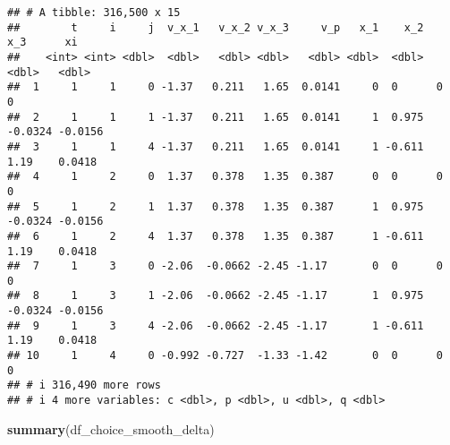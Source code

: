 \documentclass[
]{book}
\newenvironment{Shaded}{\begin{snugshade}}{\end{snugshade}}
\newcommand{\FunctionTok}[1]{\textcolor[rgb]{0.13,0.29,0.53}{\textbf{#1}}}
\newcommand{\NormalTok}[1]{#1}
\begin{document}
\begin{verbatim}
## # A tibble: 316,500 x 15
##        t     i     j  v_x_1   v_x_2 v_x_3     v_p   x_1    x_2     x_3      xi
##    <int> <int> <dbl>  <dbl>   <dbl> <dbl>   <dbl> <dbl>  <dbl>   <dbl>   <dbl>
##  1     1     1     0 -1.37   0.211   1.65  0.0141     0  0      0       0     
##  2     1     1     1 -1.37   0.211   1.65  0.0141     1  0.975 -0.0324 -0.0156
##  3     1     1     4 -1.37   0.211   1.65  0.0141     1 -0.611  1.19    0.0418
##  4     1     2     0  1.37   0.378   1.35  0.387      0  0      0       0     
##  5     1     2     1  1.37   0.378   1.35  0.387      1  0.975 -0.0324 -0.0156
##  6     1     2     4  1.37   0.378   1.35  0.387      1 -0.611  1.19    0.0418
##  7     1     3     0 -2.06  -0.0662 -2.45 -1.17       0  0      0       0     
##  8     1     3     1 -2.06  -0.0662 -2.45 -1.17       1  0.975 -0.0324 -0.0156
##  9     1     3     4 -2.06  -0.0662 -2.45 -1.17       1 -0.611  1.19    0.0418
## 10     1     4     0 -0.992 -0.727  -1.33 -1.42       0  0      0       0     
## # i 316,490 more rows
## # i 4 more variables: c <dbl>, p <dbl>, u <dbl>, q <dbl>
\end{verbatim}

\begin{Shaded}
\begin{Highlighting}[]
\FunctionTok{summary}\NormalTok{(df\_choice\_smooth\_delta)}
\end{Highlighting}
\end{Shaded}
\end{document}
